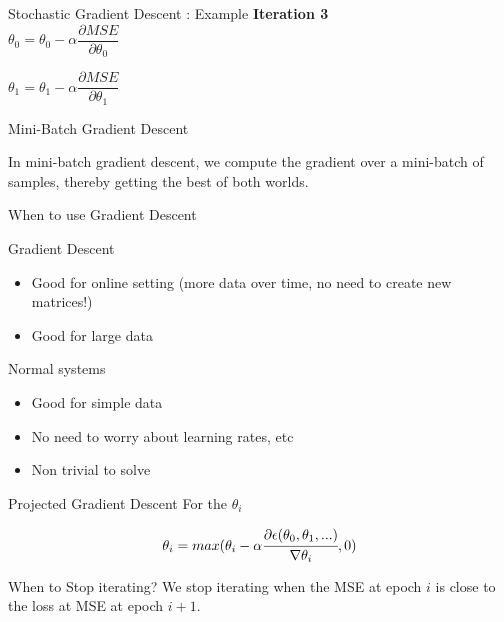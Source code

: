 \documentclass{beamer}
\begin{document}
\begin{frame}{Stochastic Gradient Descent : Example}
\textbf{Iteration 3}\\
\vspace{0.5cm}
$\theta_0 = \theta_0 - \alpha\dfrac{\partial MSE}{\partial \theta_0}$\\ 
\vspace{0.5cm}

$\theta_1 = \theta_1 - \alpha\dfrac{\partial MSE}{\partial \theta_1}$\\ 
\vspace{0.5cm}
\end{frame}

	
	\begin{frame}{Mini-Batch Gradient Descent}
		
		In mini-batch gradient descent, we compute the gradient over a mini-batch of samples, thereby getting the best of both worlds.
		
	\end{frame}
	
	\begin{frame}{When to use Gradient Descent}
		
		
		Gradient Descent
		\begin{itemize}
			\item Good for online setting (more data over time, no need to create new matrices!)
			\item Good for large data
		\end{itemize}
		
		
		Normal systems
		\begin{itemize}
			\item Good for simple data
			\item No need to worry about learning rates, etc
			\item Non trivial to solve
		\end{itemize}
	\end{frame}
	
	
	
	\begin{frame}{Projected Gradient Descent}
		For the $\theta_{i}$
		
		\begin{equation*}
		\theta_{i} = max(\theta_{i} - \alpha \cfrac{\partial \epsilon (\theta_{0},\theta_{1},...)}{ \nabla  \theta_{i}},0)
		\end{equation*}
	\end{frame}
	

	
	\begin{frame}{When to Stop iterating?}
		We stop iterating when the MSE at epoch $i$ is close to the loss at MSE at epoch $i+1$.
	\end{frame}
	
\end{document}
